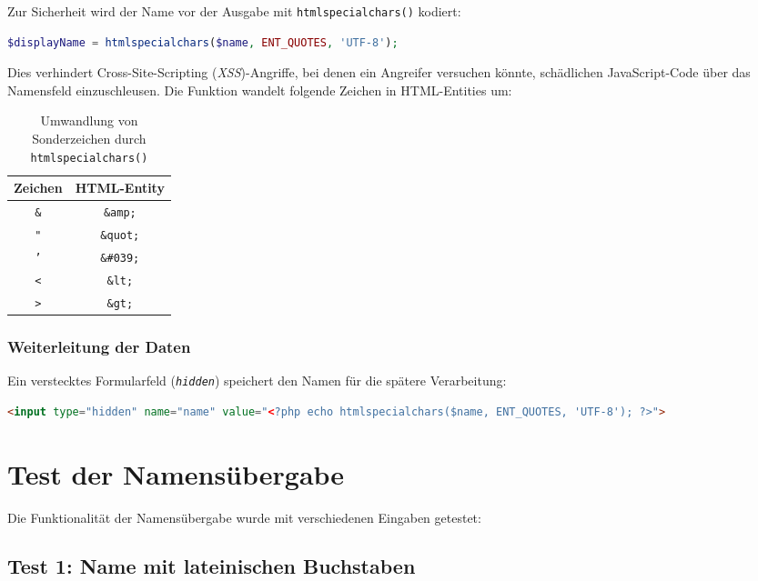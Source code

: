 Zur Sicherheit wird der Name vor der Ausgabe mit \texttt{htmlspecialchars()} kodiert:

\begin{lstlisting}[language=php]
$displayName = htmlspecialchars($name, ENT_QUOTES, 'UTF-8');
\end{lstlisting}

Dies verhindert Cross-Site-Scripting (\textit{\acs{XSS}})-Angriffe, bei denen ein Angreifer versuchen könnte, schädlichen JavaScript-Code über das Namensfeld einzuschleusen. Die Funktion wandelt folgende Zeichen in \acs{HTML}-Entities um:

\begin{table}[h]
\centering
\begin{tabular}{|c|c|}
\hline
\textbf{Zeichen} & \textbf{HTML-Entity} \\
\hline
\texttt{\&} & \texttt{\&amp;} \\
\texttt{"} & \texttt{\&quot;} \\
\texttt{'} & \texttt{\&\#039;} \\
\texttt{<} & \texttt{\&lt;} \\
\texttt{>} & \texttt{\&gt;} \\
\hline
\end{tabular}
\caption{Umwandlung von Sonderzeichen durch \texttt{htmlspecialchars()}}
\label{tab:htmlspecialchars}
\end{table}

\subsubsection{Weiterleitung der Daten}

Ein verstecktes Formularfeld (\textit{\texttt{hidden}}) speichert den Namen für die spätere Verarbeitung:

\begin{lstlisting}[language=html]
<input type="hidden" name="name" value="<?php echo htmlspecialchars($name, ENT_QUOTES, 'UTF-8'); ?>">
\end{lstlisting}

\section{Test der Namensübergabe}

Die Funktionalität der Namensübergabe wurde mit verschiedenen Eingaben getestet:

\subsection{Test 1: Name mit lateinischen Buchstaben}

